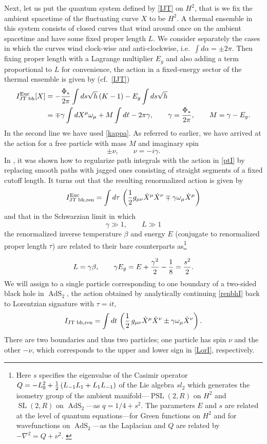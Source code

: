 \documentclass[12pt]{article}
\newcommand{\be}{\begin{equation}}
\newcommand{\ee}{\end{equation}}
\newcommand{\nn}{\nonumber\\}
\newcommand{\lt}{\left}
\newcommand{\rt}{\right}
\newcommand{\RR}{\mathbb{R}}
\DeclareMathOperator{\PSL}{PSL}
\DeclareMathOperator{\tSL}{\widetilde{\mathrm{SL}}}
\DeclareMathOperator{\tAdS}{\widetilde{AdS}}
\DeclareMathOperator{\HH}{H}
\newcommand{\om}{\omega}
\newcommand{\ga}{\gamma}
\def\ie{i.e.\ }
\def\cf{cf.\ }
\newcommand{\ov}{\over}
\def\widetilde#1{#1}%
\def\HH{H}
\def\RR{R}
\begin{document}
Next, let us put the quantum system defined by \eqref{IJT} on $\HH^2$, that is we fix the ambient spacetime of the fluctuating curve $X$ to be $\HH^2$. A thermal ensemble in this system consists of closed curves that wind around once on the ambient spacetime and have some fixed proper length $L$. We consider separately the cases in which the curves wind clock-wise and anti-clockwise, \ie $\int d\alpha= \pm 2 \pi$. Then fixing proper length with a Lagrange multiplier $E_g$ and also adding a term proportional to $L$ for convenience, the action in a fixed-energy sector of the thermal ensemble is given by (\cf \eqref{IJT})
\begin{align}\label{ptI}
I_{\text{JT bh}}^{\text{Euc}}[X]&=-{\Phi_* \ov 2 \pi}\int ds \sqrt{h}\, (K-1)-E_g \int ds \sqrt{h}\nn
&=\mp \gamma \int dX^{\mu}\om_{\mu}+M \int d\ell- 2 \pi \ga, \qquad \ga={\Phi_* \ov 2 \pi},  \qquad M=\ga-E_g.
\end{align}
In the second line we have used \eqref{kappa}. As referred to earlier, we have arrived at the action for a free particle with mass $M$ and imaginary spin 
\be
\pm\nu, \qquad  \nu=- i \ga.
\ee
In \cite{KiSuh18}, it was shown how to regularize path integrals with the action in \eqref{ptI} by replacing smooth paths with jagged ones consisting of straight segments of a fixed cutoff length. It turns out that the resulting renormalized action is given by
\be  \label{renbhI}
I^{\text{Euc}}_{\text{JT bh,ren}}=\int d\tau\, \left( {	1 \ov 2}g_{\mu\nu}\dot{X}^{\mu}\dot{X}^{\nu}\mp \ga \om_{\mu}\dot{X}^{\mu}\right)
\ee
and that in the Schwarzian limit in which
\be \label{Sch1}
\gamma \gg 1, \qquad L \gg 1
\ee
the renormalized inverse temperature $\beta$ and energy $E$ (conjugate to renormalized proper length $\tau$) are related to their bare counterparts as\footnote{Here $s$ specifies the eigenvalue of the Casimir operator $Q=-L_0^2 +{1 \over 2}\left(L_{-1}L_{1}+L_{1}L_{-1}\right)$ of the Lie algebra $sl_2$ which generates the isometry group of the ambient manifold---$\PSL(2,\RR)$ on $\HH^2$ and $\tSL(2,\RR)$ on $\tAdS_2$---as $q=1/4+s^2$. The parameters $E$ and $s$ are related at the level of quantum equations---for Green functions on $\HH^2$ and for wavefunctions on  $\tAdS_2$---as the Laplacian and $Q$ are related by $-\nabla^2=Q + \nu^2$. \label{Casimir}}

\be \label{ren}
L=\ga\beta, \qquad  \ga E_g=E+{\ga^2 \over 2}-{1 \over 8}={s^2 \ov 2}.
\ee
 We will assign to a single particle corresponding to one boundary of a two-sided black hole in $\tAdS_2$, the action obtained by analytically continuing \eqref{renbhI} back to Lorentzian signature with $\tau=it$,
\be \label{LorI}
I_{\text{JT bh,ren}}=\int dt\, \lt( {1 \ov 2}\,g_{\mu\nu}\dot{X}^{\mu}\dot{X}^{\nu}\pm \ga \om_{\mu}\dot{X}^{\nu}\rt).
\ee
There are two boundaries and thus two particles; one particle has spin $\nu$ and the other $-\nu$, which corresponds to the upper and lower sign in \eqref{LorI}, respectively.
\end{document}

